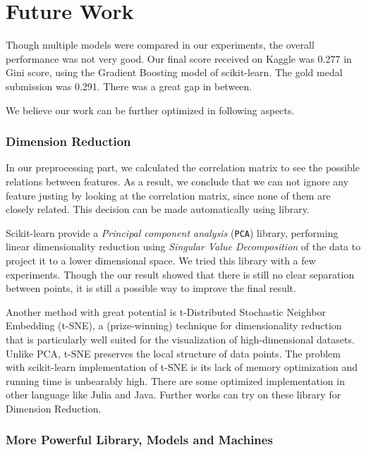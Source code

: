 \documentclass{standalone}
\begin{document}
\section{Future Work}

Though multiple models were compared in our experiments, the overall performance was not very good.
Our final score received on Kaggle was 0.277 in Gini score, using the Gradient Boosting model of scikit-learn. The gold medal submission was 0.291. There was a great gap in between.

We believe our work can be further optimized in following aspects.

\subsubsection{Dimension Reduction}

In our preprocessing part, we calculated the correlation matrix to see the possible relations between features. As a result, we conclude that we can not ignore any feature justing by looking at the correlation matrix, since none of them are closely related. This decision can be made automatically using library.

Scikit-learn provide a \emph{Principal component analysis} (\verb|PCA|) library, performing linear dimensionality reduction using \emph{Singular Value Decomposition} of the data to project it to a lower dimensional space. We tried this library with a few experiments. Though the our result showed that there is still no clear separation between points, it is still a possible way to improve the final result.

Another method with great potential is t-Distributed Stochastic Neighbor Embedding (t-SNE)\cite{van2014accelerating}, a (prize-winning) technique for dimensionality reduction that is particularly well suited for the visualization of high-dimensional datasets\cite{tsne}. Unlike PCA, t-SNE preserves the local structure of data points.
The problem with scikit-learn implementation of t-SNE is its lack of memory optimization and running time is unbearably high. There are some optimized implementation in other language like Julia\cite{tsne:julia} and Java\cite{tsne:java}. Further works can try on these library for Dimension Reduction.

\subsubsection{More Powerful Library, Models and Machines}
\end{document}
